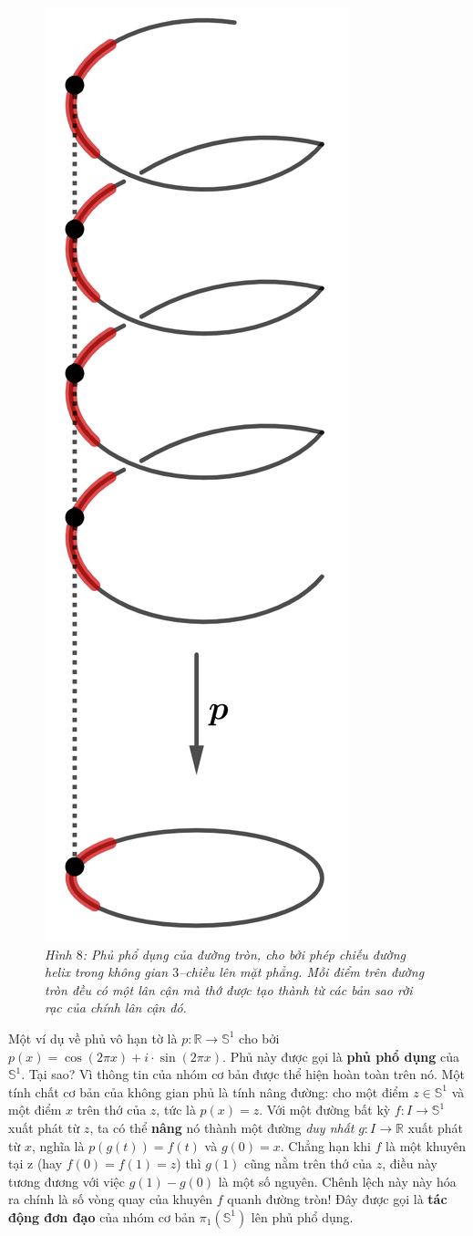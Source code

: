 \begin{multicols}{2}
		\begin{figure}[H]
		\vspace*{-5pt}
		\centering
		\captionsetup{labelformat= empty, justification=centering}
		\includegraphics[width= 0.2\linewidth]{h8.png}
		\caption{\small\textit{\color{duongvaotoanhoc}Hình $8$: Phủ phổ dụng của đường tròn, cho bởi phép chiếu đường helix trong không gian $3$--chiều lên mặt phẳng. Mỗi điểm trên đường tròn đều có một lân cận mà thớ được tạo thành từ các bản sao rời rạc của chính lân cận đó.}}
		\vspace*{-5pt}
	\end{figure}
	Một ví dụ về phủ vô hạn tờ là $p: \mathbb{R} \to \mathbb{S}^1$ cho bởi $p(x) = \cos(2\pi x)+i \cdot \sin(2\pi x)$. Phủ này được gọi là {\bf\color{duongvaotoanhoc} phủ phổ dụng} của $\mathbb{S}^1$. Tại sao? Vì thông tin của nhóm cơ bản được thể hiện hoàn toàn trên nó. Một tính chất cơ bản của không gian phủ là tính nâng đường: cho một điểm $z \in \mathbb{S}^1$ và một điểm $x$ trên thớ của $z$, tức là $p(x) = z$. Với một đường bất kỳ $f: I \to \mathbb{S}^1$ xuất phát từ $z$, ta có thể {\bf\color{duongvaotoanhoc} nâng} nó thành một đường {\it duy nhất} $g: I \to \mathbb{R}$ xuất phát từ $x$, nghĩa là $p(g(t)) = f(t)$ và $g(0) = x$. Chẳng hạn khi $f$ là một khuyên tại z (hay $f(0) = f(1) = z$) thì $g(1)$ cũng nằm trên thớ của $z$, điều này tương đương với việc $g(1) - g(0)$ là một số nguyên. Chênh lệch này này hóa ra chính là số vòng quay của khuyên $f$ quanh đường tròn! Đây được gọi là {\bf\color{duongvaotoanhoc} tác động đơn đạo} của nhóm cơ bản $\pi_1(\mathbb{S}^1)$ lên phủ phổ dụng.
	\begin{figure}[H]
		\vspace*{-5pt}
		\centering
		\captionsetup{labelformat= empty, justification=centering}

\end{figure}
\end{multicols}
